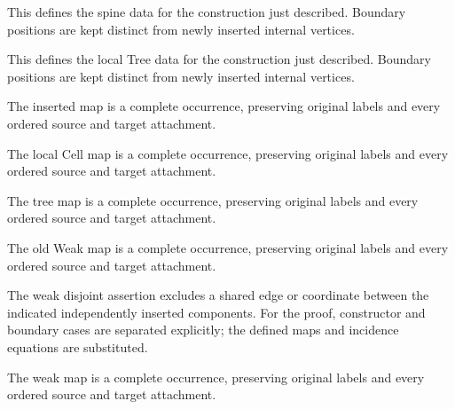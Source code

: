 This defines the spine data for the construction just described. Boundary positions are kept distinct from newly inserted internal vertices.
\par{}

This defines the local Tree data for the construction just described. Boundary positions are kept distinct from newly inserted internal vertices.
\par{}

The inserted map is a complete occurrence, preserving original labels and every ordered source and target attachment.
\par{}

The local Cell map is a complete occurrence, preserving original labels and every ordered source and target attachment.
\par{}

The tree map is a complete occurrence, preserving original labels and every ordered source and target attachment.
\par{}

The old Weak map is a complete occurrence, preserving original labels and every ordered source and target attachment.
\par{}

The weak disjoint assertion excludes a shared edge or coordinate between the indicated independently inserted components.
For the proof, constructor and boundary cases are separated explicitly; the defined maps and incidence equations are substituted.
\par{}

The weak map is a complete occurrence, preserving original labels and every ordered source and target attachment.
\par{}

